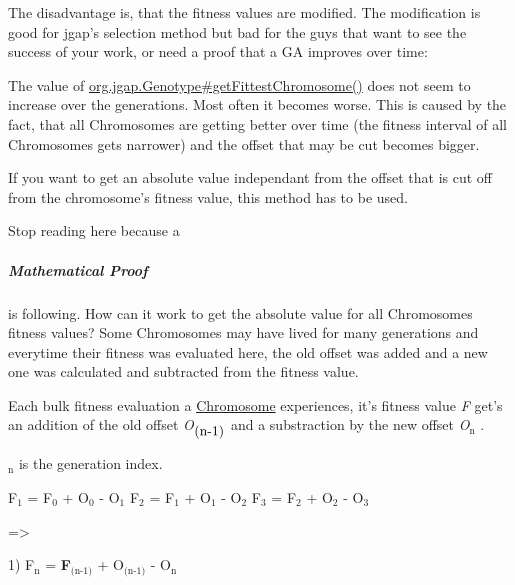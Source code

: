 The disadvantage is, that the fitness values are modified. The modification is good for jgap's selection method but bad for the guys that want to see the success of your work, or need a proof that a G\-A improves over time\-: \par
 The value of \hyperlink{classorg_1_1jgap_1_1_genotype_a05380af4c0737841c09d3a5533f9f942}{org.\-jgap.\-Genotype\#get\-Fittest\-Chromosome()} does not seem to increase over the generations. Most often it becomes worse. This is caused by the fact, that all Chromosomes are getting better over time (the fitness interval of all Chromosomes gets narrower) and the offset that may be cut becomes bigger. 

If you want to get an absolute value independant from the offset that is cut off from the chromosome's fitness value, this method has to be used. 

Stop reading here because a 

\subparagraph*{Mathematical Proof}

is following. How can it work to get the absolute value for all Chromosomes fitness values? Some Chromosomes may have lived for many generations and everytime their fitness was evaluated here, the old offset was added and a new one was calculated and subtracted from the fitness value. 

Each bulk fitness evaluation a \hyperlink{classorg_1_1jgap_1_1_chromosome}{Chromosome} experiences, it's fitness value {\itshape F} get's an addition of the old offset {\itshape O$_{\mbox{(n-\/1)}}$ } and a substraction by the new offset {\itshape O$_{\mbox{n}}$ }.\par
 {\itshape $_{\mbox{n}}$ } is the generation index.


\begin{DoxyPre}
F$_{\mbox{1}}$  = F$_{\mbox{0}}$  + O$_{\mbox{0}}$  - O$_{\mbox{1}}$ 
F$_{\mbox{2}}$  = F$_{\mbox{1}}$  + O$_{\mbox{1}}$  - O$_{\mbox{2}}$ 
F$_{\mbox{3}}$  = F$_{\mbox{2}}$  + O$_{\mbox{2}}$  - O$_{\mbox{3}}$ \end{DoxyPre}



\begin{DoxyPre}=>\end{DoxyPre}



\begin{DoxyPre}1) F$_{\mbox{n}}$  = {\bfseries F$_{\mbox{(n-1)}}$ }
+ O$_{\mbox{(n-1)}}$  - O$_{\mbox{n}}$ \end{DoxyPre}



